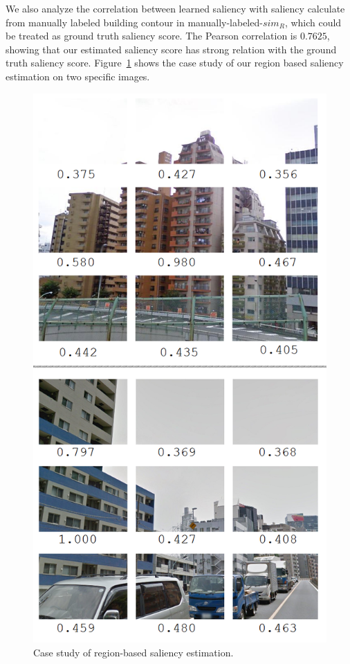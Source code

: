 We also analyze the correlation between learned saliency with saliency calculate from manually labeled building contour in manually-labeled-$sim_R$, which could be treated as ground truth saliency score. 
The Pearson correlation is $0.7625$, showing that our estimated saliency score has strong relation with the ground truth saliency score.
Figure~\ref{fig:saliencycasestudy} shows the case study of our region based saliency estimation on two specific images. 

\begin{figure}
\includegraphics[width=0.73\linewidth]{img/case_study}
\caption{\label{fig:saliencycasestudy}Case study of region-based saliency estimation.}
\end{figure}